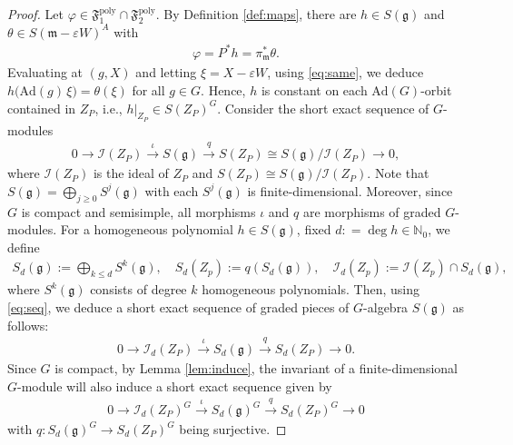 \documentclass[11pt]{amsart}
\theoremstyle{definition}
\theoremstyle{plain}
\theoremstyle{conclusion}
\begin{document}
\begin{proof}
   

Let $\varphi\in \mathfrak{F}_1^{\mathrm{poly}}\cap \mathfrak{F}_2^{\mathrm{poly}}$. By Definition \ref{def:maps}, there are $h\in S(\mathfrak{g})$ and $\theta\in S(\mathfrak{m}-\varepsilon W)^A$ with \begin{align}
\varphi=P^*h=\pi_{\mathfrak{m}}^*\theta. \label{eq:same}
\end{align} Evaluating at $(g,X)$ and letting $\xi=X-\varepsilon W$, using \eqref{eq:same}, we deduce  $h\bigl(\mathrm{Ad}(g)\,\xi\bigr)=\theta(\xi)$ for all $g \in G$. Hence, $h$ is constant on each $\mathrm{Ad}(G)$-orbit contained in $Z_P$, i.e., $h\vert_{Z_P}\in S(Z_P)^G$.  Consider the short exact sequence of $G$-modules
\begin{align}
0\longrightarrow \mathcal{I}(Z_P)\xrightarrow{\ \iota \ } S(\mathfrak{g})\xrightarrow{\ q\ } S(Z_P) \cong S(\mathfrak{g})/\mathcal{I} (Z_P)\longrightarrow 0, \label{eq:seq}
\end{align} where $\mathcal{I}(Z_P)$ is the ideal of $Z_P$ and $S(Z_P)\cong S(\mathfrak{g})/\mathcal{I}(Z_P)$. Note that $S(\mathfrak{g}) = \bigoplus_{j \geq 0} S^j(\mathfrak{g})$ with each $S^j(\mathfrak{g})$ is finite-dimensional. Moreover, since $G$ is compact and semisimple, all morphisms $\iota$ and $q$ are morphisms of graded $G$-modules. For a homogeneous polynomial $h \in S(\mathfrak{g})$, fixed $d: = \deg h \in \mathbb{N}_0$, we define \begin{align*}
    S_d(\mathfrak{g}) := \bigoplus_{k \leq d} S^k(\mathfrak{g}), \quad S_d(Z_p) := q \left(S_d(\mathfrak{g})\right), \quad \mathcal{I}_d(Z_p) := \mathcal{I}(Z_p) \cap S_d(\mathfrak{g}),
\end{align*} where $S^k(\mathfrak{g})$ consists of degree $k$ homogeneous polynomials.  Then, using \eqref{eq:seq}, we deduce a short exact sequence of graded pieces of $G$-algebra $S(\mathfrak{g})$ as follows: \begin{align}
0\longrightarrow \mathcal{I}_d(Z_P)\xrightarrow{\ \iota \ } S_d(\mathfrak{g})\xrightarrow{\ q\ } S_d(Z_P)  \longrightarrow 0 .\label{eq:finseq}
\end{align} Since $G$ is compact, by Lemma \ref{lem:induce}, the invariant of a finite-dimensional $G$-module will also induce a short exact sequence given by \begin{align}
    0\longrightarrow \mathcal{I}_d(Z_P)^G \xrightarrow{\ \iota \ } S_d(\mathfrak{g})^G \xrightarrow{\ q\ } S_d(Z_P)^G  \longrightarrow 0 \label{eq:finiteG}
\end{align} with $q:S_d(\mathfrak{g})^G \rightarrow S_d(Z_P)^G $ being surjective. 


\end{proof}
\end{document}
